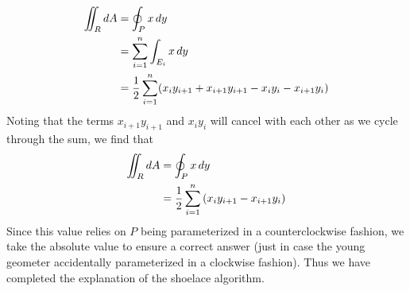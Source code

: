 \documentclass{ximera}
\begin{document}
\begin{algorithm}[Shoelace]
\begin{explanation}
    \begin{align*}
      \iint_R \mathop{}\!d A &= \oint_P x\mathop{}\!d y\\
      &= \sum_{i=1}^n \int_{E_i} x\mathop{}\!d y\\
      &= \frac{1}{2}\sum_{i=1}^n (x_i y_{i+1}+ x_{i+1} y_{i+1} - x_iy_i - x_{i+1}y_i)
    \end{align*}
    Noting that the terms $x_{i+1} y_{i+1}$ and
    $x_iy_i$ will cancel with each other as we cycle through
    the sum, we find that
    \begin{align*}
      \iint_R \mathop{}\!d A &= \oint_P x\mathop{}\!d y\\
      &= \frac{1}{2} \sum_{i=1}^n \left(x_iy_{i+1} - x_{i+1}y_i\right)
    \end{align*}
    Since this value relies on $P$ being parameterized in a
    counterclockwise fashion, we take the absolute value to ensure a
    correct answer (just in case the young geometer accidentally
    parameterized in a clockwise fashion). Thus we have completed the
    explanation of the shoelace algorithm.
  \end{explanation}
\end{algorithm}
\end{document}
